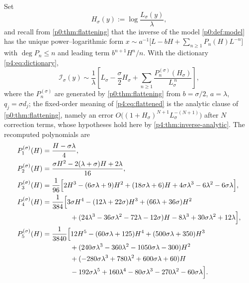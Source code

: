 \documentclass[11pt,a4paper,oneside]{book}
\theoremstyle{plain}
\theoremstyle{definition}
\theoremstyle{remark}
\begin{document}
Set
\begin{equation}
  H_\sigma(y):=\log\frac{L_\sigma(y)}{\lambda},
  \label{p4:eq:H-def}
\end{equation}
and recall from \cref{p0:thm:flattening} that the inverse of the model
\cref{p0:def:model} has the unique power--logarithmic form
$x\sim a^{-1}\bigl[L-bH+\sum_{n\ge1}P_n(H)L^{-n}\bigr]$ with $\deg P_n\le n$
and leading term $b^{n+1}H^{n}/n$.  With the dictionary
\cref{p4:eq:dictionary},
\begin{equation}
  \boxed{\;
  \mathcal I_\sigma(y)\sim\frac1\lambda\left[
    L_\sigma-\frac\sigma2H_\sigma
    +\sum_{n\ge1}\frac{P^{(\sigma)}_n(H_\sigma)}{L_\sigma^{\,n}}\right],\;}
  \label{p4:eq:flattened}
\end{equation}
where the $P^{(\sigma)}_n$ are generated by \cref{p0:thm:flattening} from
$b=\sigma/2$, $a=\lambda$, $q_j=\sigma d_j$; the fixed-order meaning of
\cref{p4:eq:flattened} is the analytic clause of \cref{p0:thm:flattening},
namely an error $O\bigl((1+H_\sigma)^{N+1}L_\sigma^{-(N+1)}\bigr)$ after $N$
correction terms, whose hypotheses hold here by
\cref{p4:thm:inverse-analytic}.  The recomputed polynomials are
\begin{align}
  P^{(\sigma)}_1(H)&=\frac{H-\sigma\lambda}{4},
  \label{p4:eq:P1}\\
  P^{(\sigma)}_2(H)&=\frac{\sigma H^{2}-2(\lambda+\sigma)H+2\lambda}{16},
  \label{p4:eq:P2}\\
  P^{(\sigma)}_3(H)&=\frac1{96}\Bigl[2H^{3}-(6\sigma\lambda+9)H^{2}
    +(18\sigma\lambda+6)H
    +4\sigma\lambda^{3}-6\lambda^{2}-6\sigma\lambda\Bigr],
  \label{p4:eq:P3}\\
  P^{(\sigma)}_4(H)&=\frac1{384}\Bigl[3\sigma H^{4}
    -(12\lambda+22\sigma)H^{3}+(66\lambda+36\sigma)H^{2}\nonumber\\
   &\hspace{14mm}{}+(24\lambda^{3}-36\sigma\lambda^{2}-72\lambda-12\sigma)H
    -8\lambda^{3}+30\sigma\lambda^{2}+12\lambda\Bigr],
  \label{p4:eq:P4}\\
  P^{(\sigma)}_5(H)&=\frac1{3840}\Bigl[12H^{5}-(60\sigma\lambda+125)H^{4}
    +(500\sigma\lambda+350)H^{3}\nonumber\\
   &\hspace{14mm}{}
    +(240\sigma\lambda^{3}-360\lambda^{2}-1050\sigma\lambda-300)H^{2}
    \nonumber\\
   &\hspace{14mm}{}
    +(-280\sigma\lambda^{3}+780\lambda^{2}+600\sigma\lambda+60)H
    \nonumber\\
   &\hspace{14mm}{}
    -192\sigma\lambda^{5}+160\lambda^{4}-80\sigma\lambda^{3}
    -270\lambda^{2}-60\sigma\lambda\Bigr].
  \label{p4:eq:P5}
\end{align}
\end{document}
